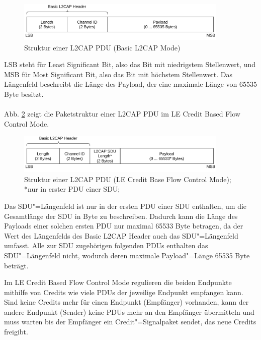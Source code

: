 \begin{figure}[H]
    \centering
    \includegraphics[width=0.9\textwidth]{graphics/l2cap_datenpaket.pdf}
    \caption[Struktur einer L2CAP PDU (Basic L2CAP Mode)]{Struktur einer L2CAP PDU (Basic L2CAP Mode) \cite{BtSpec4.2_fig_1737}}
    \label{fig: l2cap pdu basic}
\end{figure}

LSB steht für Least Significant Bit, also das Bit mit niedrigstem Stellenwert, und MSB für Most Significant Bit, also das Bit mit höchstem Stellenwert. Das Längenfeld beschreibt die Länge des Payload, der eine maximale Länge von 65535 Byte besitzt.
\\\\
Abb. \ref{fig: l2cap pdu credit} zeigt die Paketstruktur einer L2CAP PDU im LE Credit Based Flow Control Mode.

\begin{figure}
    \centering
    \includegraphics[width=0.9\textwidth]{graphics/l2cap_datenpaket_credit_based.pdf}
    \caption[Struktur einer L2CAP PDU (LE Credit Base Flow Control Mode)]{Struktur einer L2CAP PDU (LE Credit Base Flow Control Mode); *nur in erster PDU einer SDU; \cite{BtSpec4.2_fig_1747}}
    \label{fig: l2cap pdu credit}
\end{figure}

Das SDU"=Längenfeld ist nur in der ersten PDU einer SDU enthalten, um die Gesamtlänge der SDU in Byte zu beschreiben. Dadurch kann die Länge des Payloads einer solchen ersten PDU nur maximal 65533 Byte betragen, da der Wert des Längenfelds des Basic L2CAP Header auch das SDU"=Längenfeld umfasst. Alle zur SDU zugehörigen folgenden PDUs enthalten das SDU"=Längenfeld nicht, wodurch deren maximale Payload"=Länge 65535 Byte beträgt.

Im LE Credit Based Flow Control Mode regulieren die beiden Endpunkte mithilfe von Credits wie viele PDUs der jeweilige Endpunkt empfangen kann. Sind keine Credits mehr für einen Endpunkt (Empfänger) vorhanden, kann der andere Endpunkt (Sender) keine PDUs mehr an den Empfänger übermitteln und muss warten bis der Empfänger ein Credit"=Signalpaket sendet, das neue Credits freigibt. \cite{BtSpec4.2_1780}